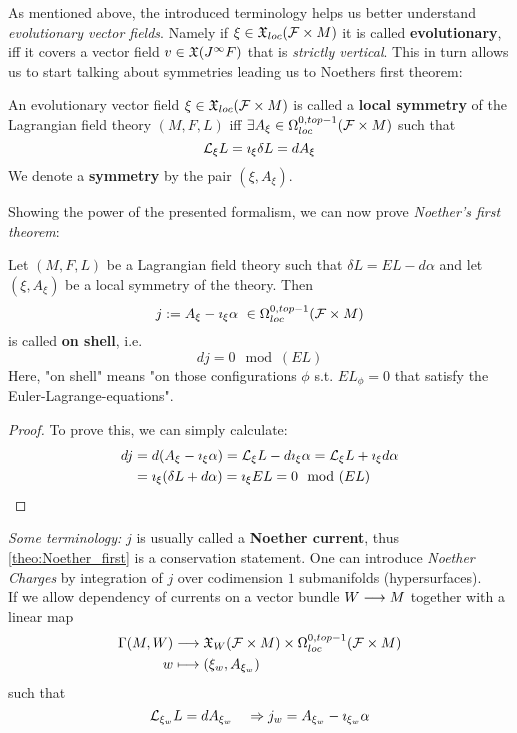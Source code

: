 As mentioned above, the introduced terminology helps us better understand \emph{evolutionary vector fields}. Namely if $\xi \in \mathfrak{X}_{loc}({\mathcal{F}} \times M)$ it is called \textbf{evolutionary}, iff it covers a vector field $v\in \mathfrak{X}(J^\infty F)$ that is \emph{strictly vertical}. This in turn allows us to start talking about symmetries leading us to   Noethers first theorem:

\begin{definition}
  An evolutionary vector field $\xi \in \mathfrak{X}_{loc}({\mathcal{F}} \times M)$ is called a \textbf{local symmetry} of the Lagrangian field theory $(M,F,L)$ iff $\exists A_\xi \in \Omega^{0,top-1}_{loc}({\mathcal{F}}\times M)$ such that
  $$ \mathcal{L}_{\xi} L = \imath_\xi \delta L = dA_\xi $$
  We denote a \textbf{symmetry} by the pair $(\xi, A_\xi)$.
\end{definition}

Showing the power of the presented formalism, we can now prove \emph{Noether's first theorem}:

\begin{theo}
\label{theo:Noether_first}
  Let $(M,F,L)$ be a Lagrangian field theory such that $\delta L = EL - d \alpha$ and let $(\xi, A_\xi)$ be a local symmetry of the theory. Then
  $$ j := A_\xi - \imath_\xi \alpha \ \in \Omega^{0,top-1}_{loc}({\mathcal{F}}\times M) $$
  is called \textbf{on shell}, i.e.
  $$d j = 0 \mod(EL)$$
  Here, "on shell" means "on those configurations $\phi$ s.t. $EL_\phi = 0$ that satisfy the Euler-Lagrange-equations".
\begin{proof}
  To prove this, we can simply calculate:
  \begin{align*}
    d j &= d(A_\xi - \imath_\xi \alpha) = \mathcal{L}_{\xi} L - d \imath_\xi \alpha = \mathcal{L}_{\xi} L + \imath_\xi d \alpha\\
    &= \imath_\xi (\delta L + d \alpha) = \imath_\xi EL = 0 \mod(EL)
  \end{align*}
\end{proof}
\end{theo}

\emph{Some terminology:} $j$ is usually called a \textbf{Noether current}, thus \ref{theo:Noether_first} is a conservation statement. One can introduce \emph{Noether Charges} by integration of $j$ over codimension $1$ submanifolds (hypersurfaces).\\

If we allow dependency of currents on a vector bundle $W\longrightarrow M$ together with a linear map
\begin{align*}
  \Gamma(M,W) &\longrightarrow \mathfrak{X}_{W}({\mathcal{F}}\times M) \times \Omega^{0,top-1}_{loc}({\mathcal{F}}\times M)\\
  w &\longmapsto (\xi_w, A_{\xi_w})
\end{align*}
such that
$$\mathcal{L}_{\xi_w}L = dA_{\xi_w} \quad \Rightarrow j_w = A_{\xi_w} - \imath_{\xi_w} \alpha$$

